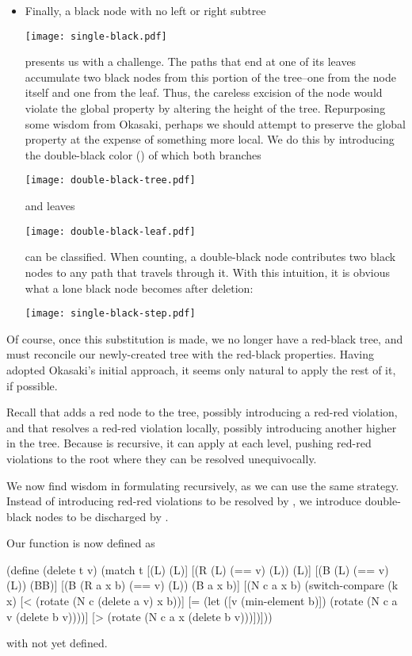 \documentclass[preprint]{sigplanconf}
\begin{document}
\begin{itemize}
\item Finally, a black node with no left or right subtree
\begin{center}
\texttt{[image: single-black.pdf]}
\end{center}
presents us with a challenge. The paths that end at one of its leaves accumulate two black nodes from this portion of the tree--one from the node itself and one from the leaf. Thus, the careless excision of the node would violate the global property by altering the height of the tree. Repurposing some wisdom from Okasaki, perhaps we should attempt to preserve the global property at the expense of something more local. We do this by introducing the double-black color () of which both branches
\begin{center}
\texttt{[image: double-black-tree.pdf]}
\end{center}
and leaves
\begin{center}
\texttt{[image: double-black-leaf.pdf]}
\end{center}
can be classified. When counting, a double-black node contributes two black nodes to any path that travels through it. With this intuition, it is obvious what a lone black node becomes after deletion:
\begin{center}
\texttt{[image: single-black-step.pdf]}
\end{center}

\end{itemize}

Of course, once this substitution is made, we no longer have a red-black tree, and must reconcile our newly-created tree with the red-black properties. Having adopted Okasaki's initial approach, it seems only natural to apply the rest of it, if possible.

Recall that  adds a red node to the tree, possibly introducing a red-red violation, and that  resolves a red-red violation locally, possibly introducing another higher in the tree. Because  is recursive, it can apply  at each level, pushing red-red violations to the root where they can be resolved unequivocally.

We now find wisdom in formulating  recursively, as we can use the same strategy. Instead of introducing red-red violations to be resolved by , we introduce double-black nodes to be discharged by .

Our  function is now defined as
\begin{schemedisplay}
(define (delete t v)
  (match t
    [(L) (L)]
    [(R (L) (== v) (L)) (L)]
    [(B (L) (== v) (L)) (BB)]
    [(B (R a x b) (== v) (L)) (B a x b)]
    [(N c a x b)
     (switch-compare
       (k x)
       [< (rotate (N c (delete a v) x b))]
       [= (let ([v (min-element b)])
            (rotate (N c a v (delete b v))))]
       [> (rotate (N c a x (delete b v)))])]))
\end{schemedisplay}
with  not yet defined.
\end{document}
